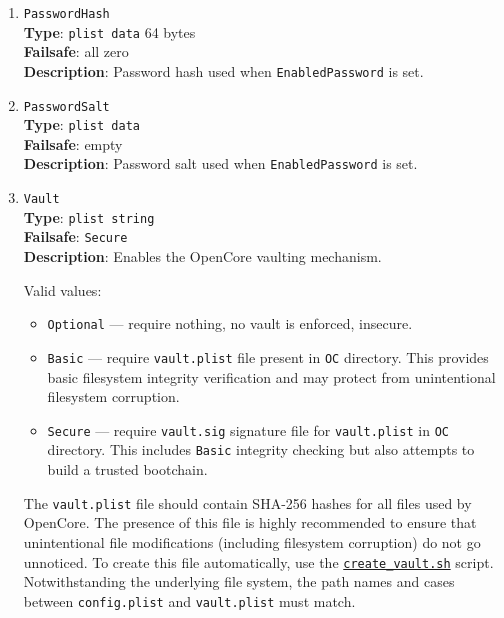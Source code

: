 \documentclass[]{article}
\providecommand{\tightlist}{%
  \setlength{\itemsep}{0pt}\setlength{\parskip}{0pt}}
\begin{document}
\begin{enumerate}
\item
  \texttt{PasswordHash}\\
  \textbf{Type}: \texttt{plist\ data} 64 bytes\\
  \textbf{Failsafe}: all zero\\
  \textbf{Description}: Password hash used when \texttt{EnabledPassword} is set.

\item
  \texttt{PasswordSalt}\\
  \textbf{Type}: \texttt{plist\ data}\\
  \textbf{Failsafe}: empty\\
  \textbf{Description}: Password salt used when \texttt{EnabledPassword} is set.

\item \label{securevaulting}
  \texttt{Vault}\\
  \textbf{Type}: \texttt{plist\ string}\\
  \textbf{Failsafe}: \texttt{Secure}\\
  \textbf{Description}: Enables the OpenCore vaulting mechanism.

  Valid values:

  \begin{itemize}
  \tightlist
  \item \texttt{Optional} --- require nothing, no vault is enforced, insecure.
  \item \texttt{Basic} --- require \texttt{vault.plist} file present
  in \texttt{OC} directory. This provides basic filesystem integrity
  verification and may protect from unintentional filesystem corruption.
  \item \texttt{Secure} --- require \texttt{vault.sig} signature file for
  \texttt{vault.plist} in \texttt{OC} directory. This includes \texttt{Basic}
  integrity checking but also attempts to build a trusted bootchain.
  \end{itemize}

  The \texttt{vault.plist} file should contain SHA-256 hashes for all files used by OpenCore.
  The presence of this file is highly recommended to ensure that unintentional file modifications
  (including filesystem corruption) do not go unnoticed. To create this file automatically, use the
  \href{https://github.com/acidanthera/OpenCorePkg/tree/master/Utilities/CreateVault}{\texttt{create\_vault.sh}}
  script. Notwithstanding the underlying file system, the path names and cases between \texttt{config.plist}
  and \texttt{vault.plist} must match.


\end{enumerate}
\end{document}

